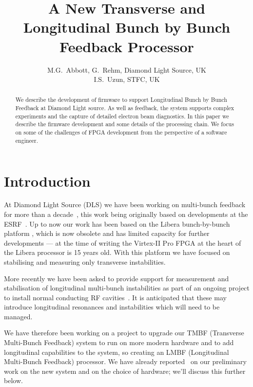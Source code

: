 \documentclass[
    a4paper,
    keeplastbox,            %
    hyphens,                %
]{jacow}
\begin{document}
\title{A New Transverse and Longitudinal Bunch by Bunch Feedback Processor}
\author{
    M.G.~Abbott, G.~Rehm, Diamond Light Source, UK \\
    I.S.~Uzun, STFC, UK}
\maketitle

\begin{abstract}

We describe the development of firmware to support Longitudinal Bunch by Bunch
Feedback at Diamond Light source.  As well as feedback, the system supports
complex experiments and the capture of detailed electron beam diagnostics.  In
this paper we describe the firmware development and some details of the
processing chain.  We focus on some of the challenges of FPGA development from
the perspective of a software engineer.

\end{abstract}


\section{Introduction}

At Diamond Light Source (DLS) we have been working on multi-bunch feedback for
more than a decade~\cite{dipac2007, epac2008, biw2010, icalepcs2011, ibic2013,
ibic2014, icalepcs2015}, this work being originally based on developments at the
ESRF~\cite{epac2006}.  Up to now our work has been based on the Libera
bunch-by-bunch platform \cite{libera}, which is now obsolete and has limited
capacity for further developments --- at the time of writing the Virtex-II Pro
FPGA at the heart of the Libera processor is 15 years old.  With this platform
we have focused on stabilising and measuring only transverse instabilities.

More recently we have been asked to provide support for measurement and
stabilisation of longitudinal multi-bunch instabilities as part of an ongoing
project to install normal conducting RF cavities~\cite{ipac2017rf}.  It is
anticipated that these may introduce longitudinal resonances and instabilities
which will need to be managed.

We have therefore been working on a project to upgrade our TMBF (Transverse
Multi-Bunch Feedback) system to run on more modern hardware and to add
longitudinal capabilities to the system, so creating an LMBF (Longitudinal
Multi-Bunch Feedback) processor.  We have already reported~\cite{ibic2016} on
our preliminary work on the new system and on the choice of hardware; we'll
discuss this further below.
\end{document}
